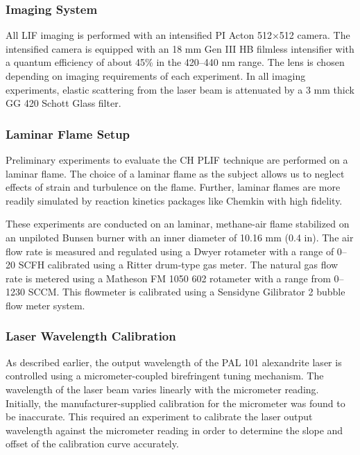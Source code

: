 \subsubsection{Imaging System}
\label{subsubsec:plif-imaging-system}

All LIF imaging is performed with an intensified PI Acton 512\(\times\)512 camera.
The intensified camera is equipped with an 18 mm Gen III HB filmless intensifier with a quantum efficiency of about 45\% in the 420--440 nm range.
The lens is chosen depending on imaging requirements of each experiment.
In all imaging experiments, elastic scattering from the laser beam is attenuated by a 3 mm thick GG 420 Schott Glass filter.

\subsubsection{Laminar Flame Setup}
\label{subsubsec:plif-laminar-flame-setup}

Preliminary experiments to evaluate the CH PLIF technique are performed on a laminar flame.
The choice of a laminar flame as the subject allows us to neglect effects of strain and turbulence on the flame.
Further, laminar flames are more readily simulated by reaction kinetics packages like Chemkin with high fidelity.

These experiments are conducted on an laminar, methane-air flame stabilized on an unpiloted Bunsen burner with an inner diameter of 10.16 mm (0.4 in).
The air flow rate is measured and regulated using a Dwyer rotameter with a range of 0--20 SCFH calibrated using a Ritter drum-type gas meter.
The natural gas flow rate is metered using a Matheson FM 1050 602 rotameter with a range from 0--1230 SCCM.
This flowmeter is calibrated using a Sensidyne Gilibrator 2 bubble flow meter system.

\subsubsection{Laser Wavelength Calibration}
\label{subsubsec:plif-laser-wavelength-calibration}



As described earlier, the output wavelength of the PAL 101 alexandrite laser is controlled using a micrometer-coupled birefringent tuning mechanism.
The wavelength of the laser beam varies linearly with the micrometer reading.
Initially, the manufacturer-supplied calibration for the micrometer was found to be inaccurate.
This required an experiment to calibrate the laser output wavelength against the micrometer reading in order to determine the slope and offset of the calibration curve accurately.

